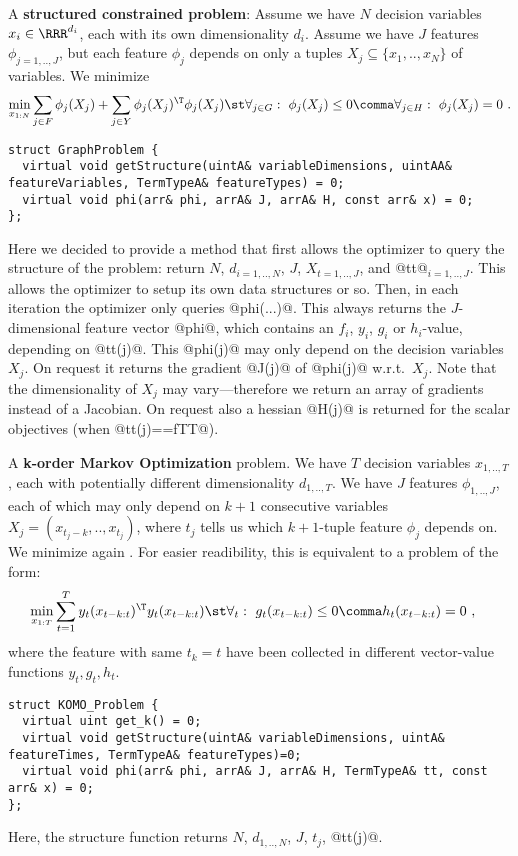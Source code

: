 \documentclass[10pt,fleqn,twoside]{article}
\begin{document}
{{A \textbf{structured constrained problem}: Assume we have $N$ decision
variables $x_i \in \RRR^{d_i}$, each with its own dimensionality
$d_i$. Assume we have $J$ features $\phi_{j=1,..,J}$, but each feature $\phi_j$
depends on only a tuples $X_j \subseteq \{x_1,..,x_N\}$ of variables. We minimize
\begin{align}\label{eqGraphOpt}
\min_{x_{1:N}} \sum_{j\in F} \phi_j(X_j) + \sum_{j\in Y} \phi_j(X_j)^\T \phi_j(X_j)
\st \forall_{j\in G}:~ \phi_j(X_j)\le 0\comma \forall_{j\in H}:~ \phi_j(X_j)=0 ~.
\end{align}
\begin{shaded}
\begin{Verbatim}
struct GraphProblem {
  virtual void getStructure(uintA& variableDimensions, uintAA& featureVariables, TermTypeA& featureTypes) = 0;
  virtual void phi(arr& phi, arrA& J, arrA& H, const arr& x) = 0;
};
\end{Verbatim}
\end{shaded}
Here we decided to provide a method that first allows the optimizer to
query the structure of the problem: return $N$, $d_{i=1,..,N}$, $J$,
$X_{t=1,..,J}$, and @tt@$_{i=1,..,J}$. This allows the optimizer to
setup its own data structures or so. Then, in each iteration the
optimizer only queries @phi(...)@. This always returns the
$J$-dimensional feature vector @phi@, which contains an $f_i$, $y_i$,
$g_i$ or $h_i$-value, depending on @tt(j)@. This @phi(j)@ may only
depend on the decision variables $X_j$. On request it returns the
gradient @J(j)@ of @phi(j)@ w.r.t.\ $X_j$. Note that the
dimensionality of $X_j$ may vary---therefore we return an array of
gradients instead of a Jacobian. On request also a hessian @H(j)@ is
returned for the scalar objectives (when @tt(j)==fTT@).

A \textbf{k-order Markov Optimization} problem. We have $T$ decision
variables $x_{1,..,T}$, each with potentially different dimensionality
$d_{1,..,T}$. We have $J$ features $\phi_{1,..,J}$, each of which may
only depend on $k+1$ consecutive variables $X_j=(x_{t_j-k},..,x_{t_j})$, where
$t_j$ tells us which $k+1$-tuple feature $\phi_j$ depends on. We
minimize again . For easier readibility, this is equivalent to a problem of the form:
\begin{align}\label{eqKOMO}
\min_{x_{1:T}}&
\sum_{t=1}^{T} y_t(x_{t-k:t})^\T y_t(x_{t-k:t})
\st
 \forall_t:~ g_t(x_{t-k:t}) \le 0\comma h_t(x_{t-k:t}) = 0 ~,
\end{align}
where the feature with same $t_k=t$ have been collected in different
vector-value functions $y_t, g_t, h_t$.
\begin{shaded}
\begin{Verbatim}
struct KOMO_Problem {
  virtual uint get_k() = 0;
  virtual void getStructure(uintA& variableDimensions, uintA& featureTimes, TermTypeA& featureTypes)=0;
  virtual void phi(arr& phi, arrA& J, arrA& H, TermTypeA& tt, const arr& x) = 0;
};
\end{Verbatim}
\end{shaded}
Here, the structure function returns $N$, $d_{1,..,N}$, $J$, $t_j$,
@tt(j)@.


}}
\end{document}
